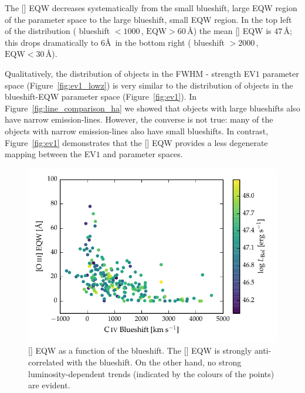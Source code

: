 The [] EQW decreases systematically from the small  blueshift, large EQW region of the parameter space to the large  blueshift, small EQW region.
In the top left of the distribution ( blueshift $<1000$\,\kms, $\text{EQW} > 60$\,\AA) the mean [] EQW is $47$\,\AA; this drops dramatically to $6$\AA\, in the bottom right ( blueshift $>2000$\,\kms, $\text{EQW} < 30$\,\AA). 

Qualitatively, the distribution of objects in the \hb FWHM -  strength EV$1$ parameter space (Figure~\ref{fig:ev1_lowz}) is very similar to the distribution of objects in the  blueshift-EQW parameter space (Figure~\ref{fig:ev1}).
In Figure~\ref{fig:line_comparison_ha} we showed that objects with large  blueshifts also have narrow \ha emission-lines.
However, the converse is not true: many of the objects with narrow \ha emission-lines also have small  blueshifts. 
In contrast, Figure~\ref{fig:ev1} demonstrates that the [] EQW provides a less degenerate mapping between the EV$1$ and  parameter spaces.

\begin{figure}
    \centering
    \includegraphics[width=\columnwidth]{figures/chapter04/civ_blueshift_oiii_eqw.pdf} 
    \caption[{[] EQW as a function of the  blueshift.}]{[] EQW as a function of the  blueshift. The [] EQW is strongly anti-correlated with the  blueshift. On the other hand, no strong luminosity-dependent trends (indicated by the colours of the points) are evident.}     
    \label{fig:civ_blueshift_oiii_eqw}
\end{figure}

